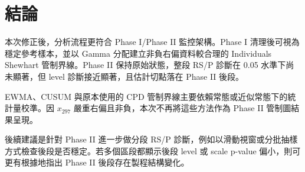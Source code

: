 \documentclass[a4paper,12pt]{report}
\begin{document}
\chapter{結論}

本次修正後，分析流程更符合 Phase I/Phase II 監控架構。Phase I 清理後可視為穩定參考樣本，並以 Gamma 分配建立非負右偏資料較合理的 Individuals Shewhart 管制界線。Phase II 保持原始狀態，整段 RS/P 診斷在 0.05 水準下尚未顯著，但 level 診斷接近顯著，且估計切點落在 Phase II 後段。

EWMA、CUSUM 與原本使用的 CPD 管制界線主要依賴常態或近似常態下的統計量校準。因 \(x_{297}\) 嚴重右偏且非負，本次不再將這些方法作為 Phase II 管制圖結果呈現。

後續建議是針對 Phase II 進一步做分段 RS/P 診斷，例如以滑動視窗或分批抽樣方式檢查後段是否穩定。若多個區段都顯示後段 level 或 scale p-value 偏小，則可更有根據地指出 Phase II 後段存在製程結構變化。
\end{document}
